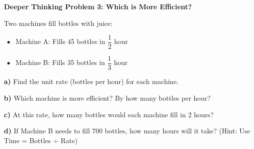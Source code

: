 \documentclass[12pt, letterpaper, fleqn]{article}
\begin{document}
\newpage

\begin{tcolorbox}[colback=white!15, colframe=black, boxrule=1.5pt, arc=4mm, left=6mm, right=6mm, top=5mm, bottom=5mm]

\textbf{Deeper Thinking Problem 3: Which is More Efficient?}

\medskip

\noindent
Two machines fill bottles with juice:
\begin{itemize}
    \item Machine A: Fills 45 bottles in $\dfrac{1}{2}$ hour
    \item Machine B: Fills 35 bottles in $\dfrac{1}{3}$ hour
\end{itemize}

\noindent
\textbf{a)} Find the unit rate (bottles per hour) for each machine.

\vspace{2.5cm}

\noindent
\textbf{b)} Which machine is more efficient? By how many bottles per hour?

\vspace{2.5cm}

\noindent
\textbf{c)} At this rate, how many bottles would each machine fill in 2 hours?

\vspace{3.5cm}

\noindent
\textbf{d)} If Machine B needs to fill 700 bottles, how many hours will it take? (Hint: Use Time = Bottles $\div$ Rate)

\vspace{4.5cm}

\end{tcolorbox}
\end{document}
